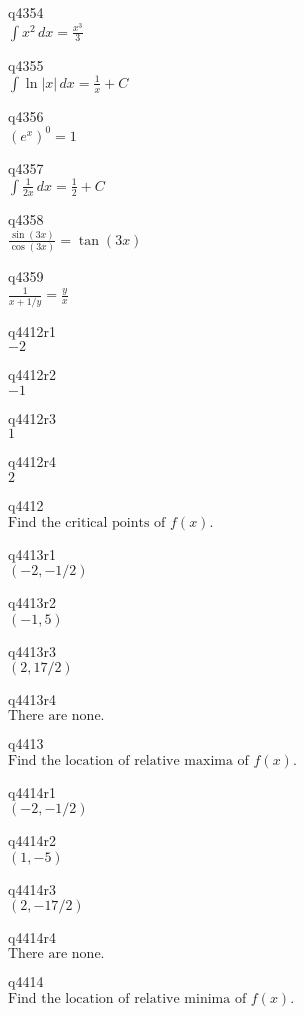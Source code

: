 q4354\\
\(\displaystyle \int x^2\,dx = \frac{x^3}{3} \)

q4355\\
\(\displaystyle \int \ln |x| \, dx = \frac{1}{x} + C \)

q4356\\
\(\displaystyle (e^x)^0 = 1 \)

q4357\\
\(\displaystyle \int \frac{1}{2x}\,dx = \frac{1}{2} + C \)

q4358\\
\(\displaystyle \frac{\sin(3x)}{\cos(3x)} = \tan(3x) \)

q4359\\
\(\displaystyle \frac{1}{x+1/y} = \frac{y}{x} \)

q4412r1\\
\(\displaystyle -2 \)

q4412r2\\
\(\displaystyle -1 \)

q4412r3\\
\(\displaystyle 1 \)

q4412r4\\
\(\displaystyle 2 \)

q4412\\
\(\displaystyle \text{Find the critical points of } f(x). \)

q4413r1\\
\(\displaystyle (-2, -1/2) \)

q4413r2\\
\(\displaystyle (-1, 5) \)

q4413r3\\
\(\displaystyle (2, 17/2) \)

q4413r4\\
\(\displaystyle \text{There are none.} \)

q4413\\
\(\displaystyle \text{Find the location of relative maxima of } f(x). \)

q4414r1\\
\(\displaystyle (-2, -1/2) \)

q4414r2\\
\(\displaystyle (1, -5) \)

q4414r3\\
\(\displaystyle (2, -17/2) \)

q4414r4\\
\(\displaystyle \text{There are none.} \)

q4414\\
\(\displaystyle \text{Find the location of relative minima of } f(x). \)

